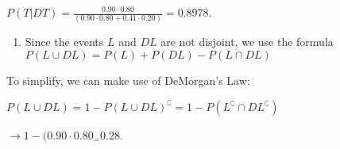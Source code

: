 \documentclass[]{article}
\providecommand{\tightlist}{%
  \setlength{\itemsep}{0pt}\setlength{\parskip}{0pt}}
\begin{document}
\(P(T|DT) = \frac{0.90\cdot 0.80}{(0.90\cdot 0.80 + 0.41\cdot 0.20)} = 0.8978\).

\begin{enumerate}
\def\labelenumi{\arabic{enumi})}
\setcounter{enumi}{2}
\tightlist
\item
  Since the events \(L\) and \(DL\) are not disjoint, we use the formula
  \(P(L \cup DL) = P(L) + P(DL) - P(L \cap DL)\)
\end{enumerate}

To simplify, we can make use of DeMorgan's Law:

\(P(L \cup DL) = 1 - P(L \cup DL)^{\complement} = 1 - P(L^{\complement}\cap DL^{\complement})\)

\(\to 1 - (0.90 \cdot 0.80_ = 0.28\).
\end{document}
